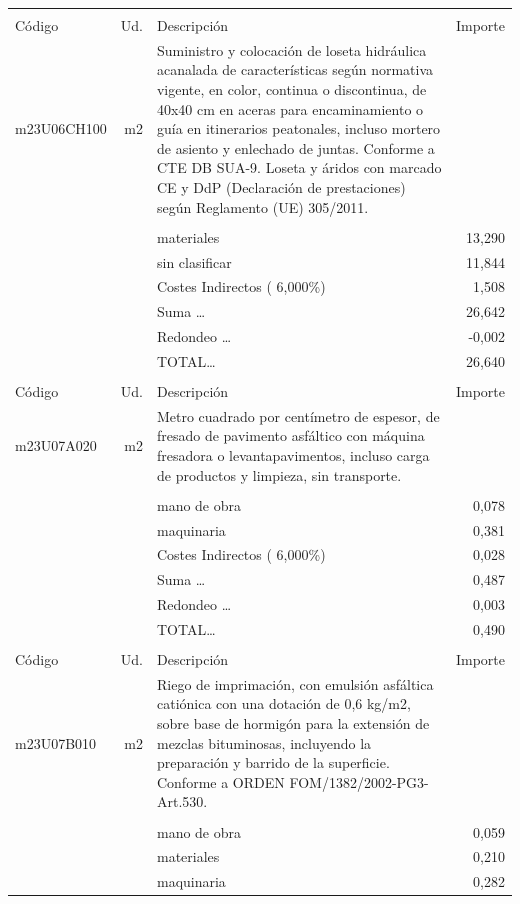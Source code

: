 \begin{supertabular}{l r p{60mm} r}
&&&\\%
Código&Ud.&Descripción&Importe\\%
\hline%
m23U06CH100&m2&Suministro y colocación de loseta hidráulica acanalada de características según normativa vigente, en color, continua o discontinua, de 40x40 cm en aceras para encaminamiento o guía en itinerarios peatonales, incluso mortero de asiento y enlechado de juntas. Conforme a CTE DB SUA{-}9. Loseta y áridos con marcado CE y DdP (Declaración de prestaciones) según Reglamento (UE) 305/2011.&\\%
&&&\\%
&&materiales&    13,290\\%
&&sin clasificar&    11,844\\%
&&Costes Indirectos (     6,000\%)&     1,508\\%
&&Suma \ldots&    26,642\\%
&&Redondeo \ldots&    {-}0,002\\%
%
&&TOTAL\ldots&    26,640\\%
&&&\\%
Código&Ud.&Descripción&Importe\\%
\hline%
m23U07A020&m2&Metro cuadrado por centímetro de espesor, de fresado de pavimento asfáltico con máquina fresadora o levantapavimentos, incluso carga de productos y limpieza, sin transporte.&\\%
&&&\\%
&&mano de obra&     0,078\\%
&&maquinaria&     0,381\\%
&&Costes Indirectos (     6,000\%)&     0,028\\%
&&Suma \ldots&     0,487\\%
&&Redondeo \ldots&     0,003\\%
%
&&TOTAL\ldots&     0,490\\%
&&&\\%
Código&Ud.&Descripción&Importe\\%
\hline%
m23U07B010&m2&Riego de imprimación, con emulsión asfáltica catiónica con una dotación de 0,6 kg/m2, sobre base de hormigón para la extensión de mezclas bituminosas, incluyendo la preparación y barrido de la superficie. Conforme a ORDEN FOM/1382/2002{-}PG3{-}Art.530.&\\%
&&&\\%
&&mano de obra&     0,059\\%
&&materiales&     0,210\\%
&&maquinaria&     0,282\\%

\end{supertabular}
